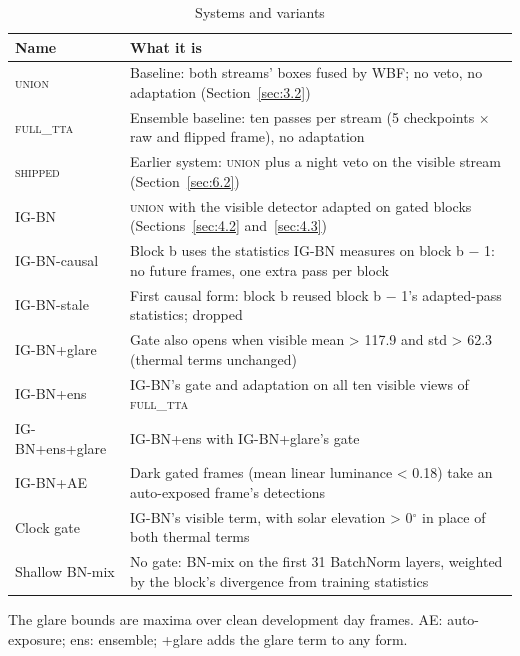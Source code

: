 \documentclass[journal]{IEEEtran}
\begin{document}
\begin{table}[htbp]
\centering
\footnotesize
\caption{Systems and variants}
\label{tab:22}
\begin{tabularx}{\linewidth}{l>{\raggedright\arraybackslash}X}
\toprule
Name & What it is \\
\midrule
\textsc{union} & Baseline: both streams' boxes fused by WBF; no veto, no adaptation (Section~\ref{sec:3.2}) \\
\textsc{full\_tta} & Ensemble baseline: ten passes per stream (5 checkpoints $\times$ raw and flipped frame), no adaptation \\
\textsc{shipped} & Earlier system: \textsc{union} plus a night veto on the visible stream (Section~\ref{sec:6.2}) \\
\mbox{IG-BN} & \textsc{union} with the visible detector adapted on gated blocks (Sections~\ref{sec:4.2} and~\ref{sec:4.3}) \\
\mbox{IG-BN-causal} & Block b uses the statistics \mbox{IG-BN} measures on block b $-$ 1: no future frames, one extra pass per block \\
\mbox{IG-BN-stale} & First causal form: block b reused block b $-$ 1's adapted-pass statistics; dropped \\
\mbox{IG-BN+glare} & Gate also opens when visible mean > 117.9 and std > 62.3 (thermal terms unchanged) \\
\mbox{IG-BN+ens} & \mbox{IG-BN}'s gate and adaptation on all ten visible views of \textsc{full\_tta} \\
\mbox{IG-BN+ens+glare} & \mbox{IG-BN+ens} with \mbox{IG-BN+glare}'s gate \\
\mbox{IG-BN+AE} & Dark gated frames (mean linear luminance < 0.18) take an auto-exposed frame's detections \\
Clock gate & \mbox{IG-BN}'s visible term, with solar elevation > 0$^{\circ}$ in place of both thermal terms \\
Shallow BN-mix & No gate: BN-mix on the first 31 BatchNorm layers, weighted by the block's divergence from training statistics \\
\bottomrule
\end{tabularx}
\par\smallskip\raggedright\footnotesize The glare bounds are maxima over clean development day frames. AE: auto-exposure; ens: ensemble; +glare adds the glare term to any form.
\end{table}
\end{document}

